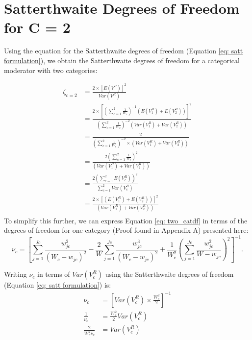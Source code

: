 \section{Satterthwaite Degrees of Freedom for C = 2}


Using the equation for the Satterthwaite degrees of freedom (Equation \ref{eq: satt formulation}), we obtain the Satterthwaite degrees of freedom for a categorical moderator with two categories:

\begin{equation}
    \begin{split}
        \zeta_{c = 2} & = \frac{2 \times [E(V^R)]^2}{Var(V^R)} \\
              & = \frac{2 \times \left[\left(\sum_{c=1}^2 \frac{1}{W_c}  \right)^{-1} \left(E(V^R_1) + E(V^R_2)  \right) \right]^2}{\left(\sum_{c=1}^2 \frac{1}{W_c}  \right)^{-2 } \left(Var(V^R_1) + Var(V^R_2)  \right)} \\
              & = \frac{2}{\left(\sum_{c=1}^2 \frac{1}{W_c}  \right)^{-2 } \times (Var(V_1^R) + Var(V_2^R))} \\
              & = \frac{2 \left(\sum_{c=1}^2 \frac{1}{W_c}  \right)^{2 }}{ (Var(V_1^R) + Var(V_2^R))} \\
            & = \frac{2 \left(\sum_{c=1}^2 E(V^R_c)  \right)^{2 }}{ \sum_{c=1}^2 Var(V^R_c) } \\
              & = \frac{2 \times \left[ \left(E(V^R_1) + E(V^R_2)  \right) \right]^2}{\left(Var(V^R_1) + Var(V^R_2)  \right)} \\
    \end{split}
    \nonumber
\end{equation}
To simplify this further, we can express Equation \ref{eq: two_catdf} in terms of the degrees of freedom for one category (Proof found  in Appendix A) presented here: 
\begin{equation}
   \nu_c = \left[ \sum_{j = 1} ^{Jc} \frac{w^2_{jc}}{ (W_c - w_{jc}) ^2} - \frac{2}{W} \sum_{j = 1} ^{Jc} \frac{w_{jc}^3}{(W_c - w_{jc})^2} + \frac{1}{W_c^2} \left(\sum_{j = 1} ^{Jc} \frac{w_{jc}^2}{W-w_{jc}} \right)^2 \right]^{-1}.
   \nonumber
\end{equation}

Writing $\nu_c$ in terms of $Var(V_c^R)$ using the Satterthwaite degrees of freedom (Equation \ref{eq: satt formulation}) is:
 \begin{equation}
\begin{split}
    \nu_c &= \left[ Var(V_c^R) \times \frac{W_c^2}{2} \right]^{-1} \\
    \frac{1}{\nu_c} &= \frac{W^2_c}{2}Var(V_c^R) \\
    \frac{2}{W^2_c\nu_c} &= Var(V_c^R) \\
 \nonumber 
\end{split}
 \end{equation}
 
